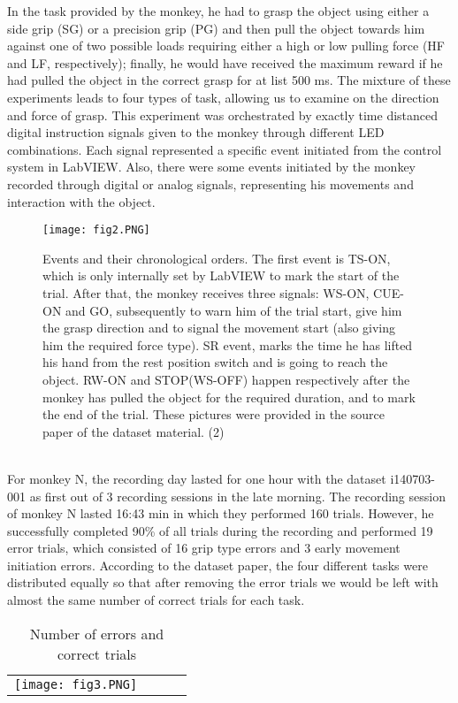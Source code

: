 \documentclass[9pt,twocolumn]{paper-template}
\begin{document}
In the task provided by the monkey, he had to grasp the object using either a side grip (SG) or a precision grip (PG) and then pull the object towards him against one of two possible loads requiring either a high or low pulling force (HF and LF, respectively); finally, he would have received the maximum reward if he had pulled the object in the correct grasp for at list 500 ms. The mixture of these experiments leads to four types of task, allowing us to examine on the direction and force of grasp. This experiment was orchestrated by exactly time distanced digital instruction signals given to the monkey through different LED combinations. Each signal represented a specific event initiated from the control system in LabVIEW. Also, there were some events initiated by the monkey recorded through digital or analog signals, representing his movements and interaction with the object.
\\
\begin{figure}%
\centering
\texttt{[image: fig2.PNG]}
\caption{ Events and their chronological orders. The first event is TS-ON, which is only internally set by LabVIEW to mark the start of the trial. After that, the monkey receives three signals: WS-ON, CUE-ON and GO, subsequently to warn him of the trial start, give him the grasp direction and to signal the movement start (also giving him the required force type). SR event, marks the time he has lifted his hand from the rest position switch and is going to reach the object. RW-ON and STOP(WS-OFF) happen respectively after the monkey has pulled the object for the required duration, and to mark the end of the trial. These pictures were provided in the source paper of the dataset material. (2)}
\label{fig:frog}
\end{figure}
\\
For monkey N, the recording day lasted for one hour with the dataset i140703-001 as first out of 3 recording sessions in the late morning. The recording session of monkey N lasted 16:43 min in which they performed 160 trials. However, he successfully completed 90\% of all trials during the recording and performed 19 error trials, which consisted of 16 grip type errors and 3 early movement initiation errors. According to the dataset paper, the four different tasks were distributed equally so that after removing the error trials we would be left with almost the same number of correct trials for each task.\\
\begin{table}%
\centering
\caption{Number of errors and correct trials}
\begin{tabular}{lrrr}
\texttt{[image: fig3.PNG]}
\end{tabular}

\end{table}
\end{document}
